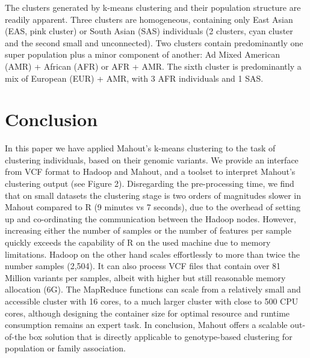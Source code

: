 \documentclass{bioinfo}
\begin{document}
The clusters generated by k-means clustering and their population structure are readily apparent. 
Three clusters are homogeneous, containing only East Asian (EAS, pink cluster) or South Asian (SAS) individuals (2 clusters, cyan cluster and the second small and unconnected).
Two clusters contain predominantly one super population plus a minor component of another: Ad Mixed American (AMR) + African (AFR) or AFR + AMR. 
The sixth cluster is predominantly a mix of European (EUR) + AMR, with 3 AFR individuals and 1 SAS.


\section*{Conclusion}
In this paper we have applied Mahout's k-means clustering to the task of clustering individuals, based on their genomic variants. 
We provide an interface from VCF format to Hadoop and Mahout, and a toolset to interpret Mahout's clustering output (see Figure 2).
Disregarding the pre-processing time, we find that on small datasets the clustering stage is two orders of magnitudes slower in Mahout compared to R (9 minutes vs 7 seconds), due to the overhead of setting up and co-ordinating the communication between the Hadoop nodes. 
However, increasing either the number of samples or the number of features per sample quickly exceeds the capability of R on the used machine due to memory limitations.
Hadoop on the other hand scales effortlessly to more than twice the number samples (2,504). It can also process VCF files that contain over 81 Million variants per samples, albeit with higher but still reasonable memory allocation (6G).
The MapReduce functions can scale from a relatively small and accessible cluster with 16 cores, to a much larger cluster with close to 500 CPU cores, although designing the container size for optimal resource and runtime consumption remains an expert task. 
In conclusion, Mahout offers a scalable out-of-the box solution that is directly applicable to genotype-based clustering for population or family association. 
\end{document}
